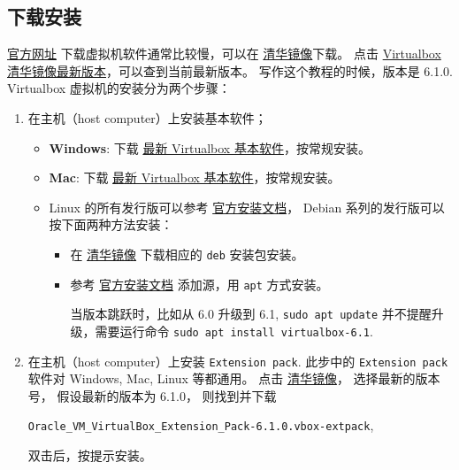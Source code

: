 \documentclass[
    11pt,
    cite=authoryear,
    device=normal,
    lang=cn,
    mode=simple,
    result=answer,
    toc=onecol,
]{elegantbook_sierxue}
\begin{document}
\subsection{下载安装}%
\label{sub:vbox-install}
\href{https://www.virtualbox.org/wiki/Downloads}{官方网址}
下载虚拟机软件通常比较慢，可以在
\href{https://mirror.tuna.tsinghua.edu.cn/virtualbox/}{清华镜像}下载。
点击
\href{https://mirror.tuna.tsinghua.edu.cn/virtualbox/LATEST.TXT}
{Virtualbox清华镜像最新版本}，可以查到当前最新版本。
写作这个教程的时候，版本是 6.1.0.
Virtualbox 虚拟机的安装分为两个步骤：
\begin{enumerate}
    \item 在主机（host computer）上安装基本软件；
        \begin{itemize}
            \item \textbf{Windows}: 下载
                \href{https://mirror.tuna.tsinghua.edu.cn/virtualbox/virtualbox-Win-latest.exe}
                {最新 Virtualbox 基本软件}，按常规安装。
            \item \textbf{Mac}: 下载
                \href{https://mirror.tuna.tsinghua.edu.cn/virtualbox/virtualbox-osx-latest.dmg}
                {最新 Virtualbox 基本软件}，按常规安装。
            \item Linux 的所有发行版可以参考
                \href{https://www.virtualbox.org/wiki/Linux_Downloads}{官方安装文档}，
                Debian 系列的发行版可以按下面两种方法安装：
                \begin{itemize}
                    \item 在
                        \href{https://mirror.tuna.tsinghua.edu.cn/virtualbox/}
                        {清华镜像}
                        下载相应的 \lstinline{deb} 安装包安装。
                    \item 参考
                        \href{https://www.virtualbox.org/wiki/Linux_Downloads}
                        {官方安装文档}
                        添加源，用 \lstinline{apt} 方式安装。
                        \begin{note}\label{note:vbox-apt-upgrade}
                           当版本跳跃时，比如从 6.0 升级到 6.1,
                           \lstinline{sudo apt update}
                           并不提醒升级，需要运行命令
                           \lstinline{sudo apt install virtualbox-6.1}.
                        \end{note}
                \end{itemize}
        \end{itemize}
    \item 在主机（host computer）上安装 \lstinline{Extension pack}.
        此步中的 \lstinline{Extension pack} 软件对 Windows, Mac, Linux
        等都通用。
        点击
        \href{https://mirror.tuna.tsinghua.edu.cn/virtualbox/}{清华镜像}，
        选择最新的版本号，
        假设最新的版本为 6.1.0，
        则找到并下载
        \begin{center}\label{center:vm-extension}
            \lstinline{Oracle_VM_VirtualBox_Extension_Pack-6.1.0.vbox-extpack},
        \end{center}
        双击后，按提示安装。
\end{enumerate}
\end{document}
